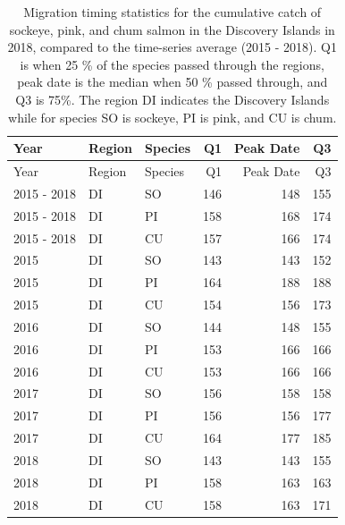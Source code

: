 \documentclass[fleqn,10pt]{wlpeerj} %
\begin{document}
\begin{longtable}[]{@{}lllrrr@{}}
\caption{\label{tab:mtdi} Migration timing statistics for the cumulative
catch of sockeye, pink, and chum salmon in the Discovery Islands in
2018, compared to the time-series average (2015 - 2018). Q1 is when 25
\% of the species passed through the regions, peak date is the median
when 50 \% passed through, and Q3 is 75\%. The region DI indicates the
Discovery Islands while for species SO is sockeye, PI is pink, and CU is
chum.}\tabularnewline
\toprule
Year & Region & Species & Q1 & Peak Date & Q3\tabularnewline
\midrule
\endfirsthead
\toprule
Year & Region & Species & Q1 & Peak Date & Q3\tabularnewline
\midrule
\endhead
2015 - 2018 & DI & SO & 146 & 148 & 155\tabularnewline
2015 - 2018 & DI & PI & 158 & 168 & 174\tabularnewline
2015 - 2018 & DI & CU & 157 & 166 & 174\tabularnewline
2015 & DI & SO & 143 & 143 & 152\tabularnewline
2015 & DI & PI & 164 & 188 & 188\tabularnewline
2015 & DI & CU & 154 & 156 & 173\tabularnewline
2016 & DI & SO & 144 & 148 & 155\tabularnewline
2016 & DI & PI & 153 & 166 & 166\tabularnewline
2016 & DI & CU & 153 & 166 & 166\tabularnewline
2017 & DI & SO & 156 & 158 & 158\tabularnewline
2017 & DI & PI & 156 & 156 & 177\tabularnewline
2017 & DI & CU & 164 & 177 & 185\tabularnewline
2018 & DI & SO & 143 & 143 & 155\tabularnewline
2018 & DI & PI & 158 & 163 & 163\tabularnewline
2018 & DI & CU & 158 & 163 & 171\tabularnewline
\bottomrule
\end{longtable}
\end{document}
